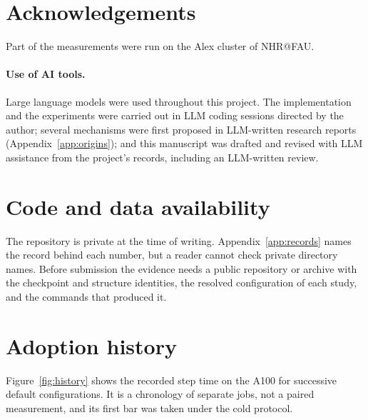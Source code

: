 \documentclass[11pt]{article}
\begin{document}
\section*{Acknowledgements}

Part of the measurements were run on the Alex cluster of NHR@FAU.

\paragraph{Use of AI tools.}
Large language models were used throughout this project. The implementation and the experiments were carried out
in LLM coding sessions directed by the author; several mechanisms were first proposed in LLM-written research
reports (Appendix~\ref{app:origins}); and this manuscript was drafted and revised with LLM assistance from the
project's records, including an LLM-written review.

\section*{Code and data availability}

The repository is private at the time of writing. Appendix~\ref{app:records} names the record behind each
number, but a reader cannot check private directory names. Before submission the evidence needs a public
repository or archive with the checkpoint and structure identities, the resolved configuration of each study,
and the commands that produced it.




\clearpage
\appendix

\section{Adoption history}
\label{app:history}

Figure~\ref{fig:history} shows the recorded step time on the A100 for successive default configurations. It is a
chronology of separate jobs, not a paired measurement, and its first bar was taken under the cold protocol.
\end{document}
